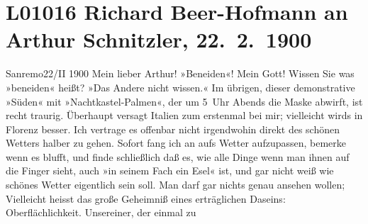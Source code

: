 

\section[Richard Beer-Hofmann an Arthur Schnitzler, 22. 2. 1900]{L01016 Richard Beer-Hofmann an Arthur Schnitzler, 22. 2. 1900}
\nopagebreak{}
\rehead{ }\normalsize\beginnumbering{}
\toendnotes[C]{\smallbreak\pagebreak[2]}
\toendnotes[C]{\smallbreak}
\toendnotes[C]{\smallbreak}
\pstart
           \raggedleft{}{\pb}Sanremo22/II 1900\pend
           \vspace{0.5em}
\pstart
           Mein lieber Arthur! »Beneiden«! Mein Gott! Wissen Sie was »beneiden«
               heißt? »Das Andere nicht wissen.« Im übrigen, dieser demonstrative »Süden« mit
               »Nachtkastel-Palmen«, der um 5 Uhr Abends die Maske abwirft, ist recht traurig.
               Überhaupt versagt Italien zum erstenmal bei
               mir; vielleicht wirds in Florenz besser. Ich
               vertrage es offenbar nicht irgendwohin direkt des schönen Wetters halber zu gehen.
               Sofort fang ich an aufs Wetter aufzupassen, bemerke wenn es blufft, und finde
               schließlich daß es, wie alle Dinge wenn man ihnen auf die Finger sieht, auch »in
               seinem Fach ein Esel« ist, und gar nicht weiß wie schönes Wetter eigentlich sein
               soll. Man darf gar nichts genau ansehen wollen; {\pb}Vielleicht heisst das große
               Geheimniß eines erträglichen Daseins: Oberflächlichkeit. Unsereiner, der einmal zu
